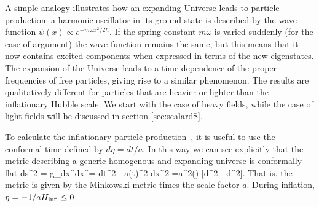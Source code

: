 A simple analogy illustrates how an expanding Universe leads to particle production: 
a harmonic oscillator in its ground state is described by the wave
function $\psi(x) \propto e^{-m\omega x^2/2\hbar}$. If the spring constant $m\omega$ is varied
suddenly (for the ease of argument)
the wave function remains the same, but this means that it now contains excited components when expressed in terms of the new eigenstates.
The expansion of the Universe leads to a time dependence of the proper frequencies of free particles, giving rise to a similar phenomenon.
The results are qualitatively different 
for particles that are heavier or lighter than the inflationary Hubble scale. We start with the case of heavy fields, while the case of light fields will be discussed in section \ref{sec:scalardS}.

\medskip

To calculate the inflationary particle production~\cite{DMprodInflation}, it is useful to use the conformal time defined by $d\eta = dt/a$. In this way we can see explicitly that the
metric describing a generic homogenous and expanding  universe is conformally flat
\beq ds^2 = g_{\mu\nu}dx^\mu dx^\nu  = dt^2 - a(t)^2  d\vec x^2 =a^2(\eta) [d\eta^2  - d^2].\eeq
That is, the metric is given by the Minkowski metric times the scale factor  $a$.
During inflation, $\eta = - 1/aH_{\rm infl} \le 0$.

\medskip

